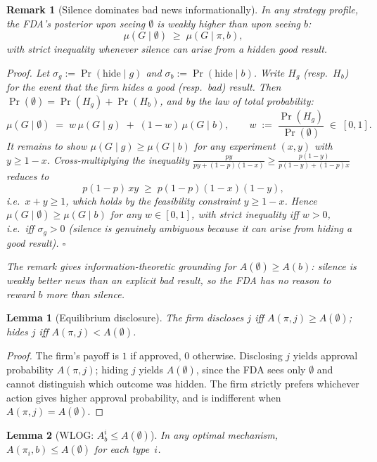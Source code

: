 \documentclass[12pt,a4paper]{article}
\newtheorem{lemma}{Lemma}
\newtheorem{remark}{Remark}
\begin{document}
\begin{remark}[Silence dominates bad news informationally]
\label{rem:silence}
In any strategy profile, the FDA's posterior upon seeing
$\emptyset$ is weakly higher than upon seeing $b$:
\[
  \mu(G \mid \emptyset) \;\geq\; \mu(G \mid \pi, b),
\]
with strict inequality whenever silence can arise from a
hidden good result.

\medskip
\noindent\textit{Proof.}
Let $\sigma_g := \Pr(\text{hide}\mid g)$ and
$\sigma_b := \Pr(\text{hide}\mid b)$.
Write $H_g$ (resp.\ $H_b$) for the event that the firm
hides a good (resp.\ bad) result. Then
$\Pr(\emptyset) = \Pr(H_g) + \Pr(H_b)$, and by the law of
total probability:
\[
  \mu(G\mid\emptyset)
  \;=\;
  w\,\mu(G\mid g) \;+\; (1-w)\,\mu(G\mid b),
  \qquad
  w \;:=\; \frac{\Pr(H_g)}{\Pr(\emptyset)} \;\in\; [0,1].
\]
It remains to show $\mu(G\mid g) \geq \mu(G\mid b)$ for
any experiment $(x,y)$ with $y\geq 1-x$.
Cross-multiplying the inequality
$\frac{py}{py+(1-p)(1-x)} \geq \frac{p(1-y)}{p(1-y)+(1-p)x}$
reduces to
\[
  p(1-p)\,xy \;\geq\; p(1-p)(1-x)(1-y),
\]
i.e.\ $x+y \geq 1$, which holds by the feasibility
constraint $y\geq 1-x$.
Hence $\mu(G\mid\emptyset) \geq \mu(G\mid b)$ for any
$w\in[0,1]$, with strict inequality iff $w>0$, i.e.\
iff $\sigma_g>0$ (silence is genuinely ambiguous because
it can arise from hiding a good result).
\hfill$\square$

\medskip
The remark gives information-theoretic grounding for
$A(\emptyset)\geq A(b)$: silence is weakly better news
than an explicit bad result, so the FDA has no reason to
reward $b$ more than silence.
\end{remark}

\begin{lemma}[Equilibrium disclosure]\label{lem:disclosure}
The firm discloses $j$ iff $A(\pi, j) \geq A(\emptyset)$;
hides $j$ iff $A(\pi, j) < A(\emptyset)$.
\end{lemma}

\begin{proof}
The firm's payoff is $1$ if approved, $0$ otherwise.
Disclosing $j$ yields approval probability $A(\pi,j)$;
hiding $j$ yields $A(\emptyset)$, since the FDA sees only
$\emptyset$ and cannot distinguish which outcome was hidden.
The firm strictly prefers whichever action gives higher
approval probability, and is indifferent when
$A(\pi,j) = A(\emptyset)$.
\end{proof}

\begin{lemma}[WLOG: $A_b^i \leq A(\emptyset)$]
\label{lem:wlog_Ab}
In any optimal mechanism, $A(\pi_i, b) \leq A(\emptyset)$
for each type~$i$.
\end{lemma}
\end{document}
